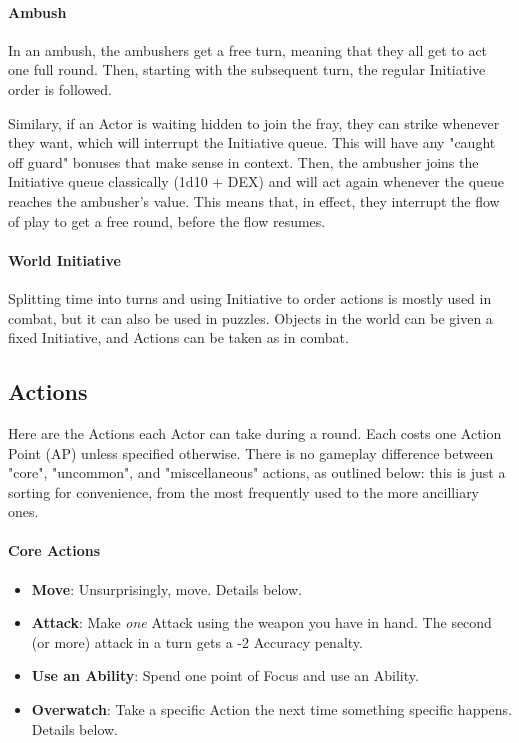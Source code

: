 \paragraph{Ambush}

In an ambush, the ambushers get a free turn, meaning that they all get to act one full round. Then, starting with the subsequent turn, the regular Initiative order is followed.

Similary, if an Actor is waiting hidden to join the fray, they can strike whenever they want, which will interrupt the Initiative queue. This will have any "caught off guard" bonuses that make sense in context. Then, the ambusher joins the Initiative queue classically (1d10 + DEX) and will act again whenever the queue reaches the ambusher's value. This means that, in effect, they interrupt the flow of play to get a free round, before the flow resumes.

\paragraph{World Initiative} 

Splitting time into turns and using Initiative to order actions is mostly used in combat, but it can also be used in puzzles. Objects in the world can be given a fixed Initiative, and Actions can be taken as in combat. 


\subsection{Actions}
\label{actions}

Here are the Actions each Actor can take during a round. Each costs one Action Point (AP) unless specified otherwise. There is no gameplay difference between "core", "uncommon", and "miscellaneous" actions, as outlined below: this is just a sorting for convenience, from the most frequently used to the more ancilliary ones.

\paragraph{Core Actions}
\begin{itemize}
    \item \textbf{Move}: Unsurprisingly, move. Details below.
    \item \textbf{Attack}: Make \textit{one} Attack using the weapon you have in hand. The second (or more) attack in a turn gets a -2 Accuracy penalty.
    \item \textbf{Use an Ability}: Spend one point of Focus and use an Ability.
    \item \textbf{Overwatch}: Take a specific Action the next time something specific happens. Details below.
\end{itemize}

